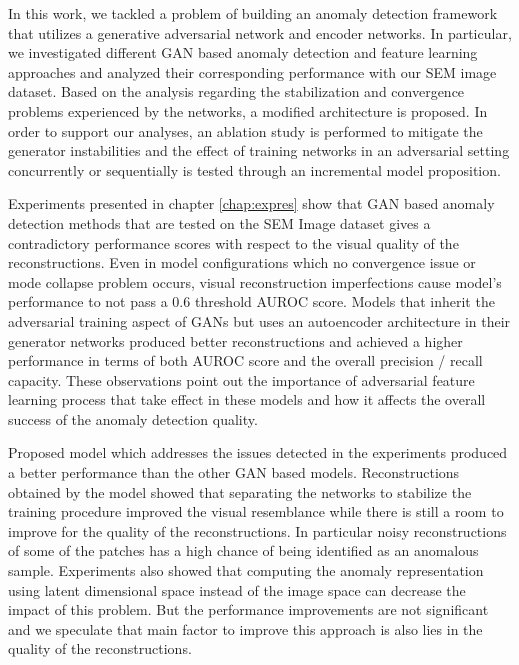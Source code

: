 
\begingroup

In this work, we tackled a problem of building an anomaly detection framework that utilizes a 
generative adversarial network and encoder networks. In particular, we investigated different 
GAN based anomaly detection and feature learning approaches and analyzed their corresponding 
performance with our SEM image dataset. Based on the analysis regarding the stabilization and 
convergence problems experienced by the networks, a modified architecture is proposed. In order to support 
our analyses, an ablation study is performed to mitigate the generator instabilities and the 
effect of training networks in an adversarial setting concurrently or sequentially is tested through 
an incremental model proposition.

Experiments presented in chapter \ref{chap:expres} show that GAN based anomaly detection methods that 
are tested on the SEM Image dataset gives a contradictory performance scores with respect to the visual 
quality of the reconstructions. Even in model configurations which no convergence issue or mode collapse problem 
occurs, visual reconstruction imperfections cause model's performance to not pass a $0.6$ threshold AUROC score.
Models that inherit the adversarial training aspect of GANs but uses an autoencoder architecture in 
their generator networks produced better reconstructions and achieved a higher performance in terms 
of both AUROC score and the overall precision / recall capacity. These observations point out the importance 
of adversarial feature learning process that take effect in these models and how it affects the overall success 
of the anomaly detection quality.

Proposed model which addresses the issues detected in the experiments produced a better performance 
than the other GAN based models. Reconstructions obtained by the model showed that separating the networks 
to stabilize the training procedure improved the visual resemblance while there is still a room to improve 
for the quality of the reconstructions. In particular noisy reconstructions of some of the patches has a high 
chance of being identified as an anomalous sample. Experiments also showed that computing the anomaly 
representation using latent dimensional space instead of the image space can decrease the impact of this problem. 
But the performance improvements are not significant and we speculate that main factor to improve this approach 
is also lies in the quality of the reconstructions.

\endgroup
 
